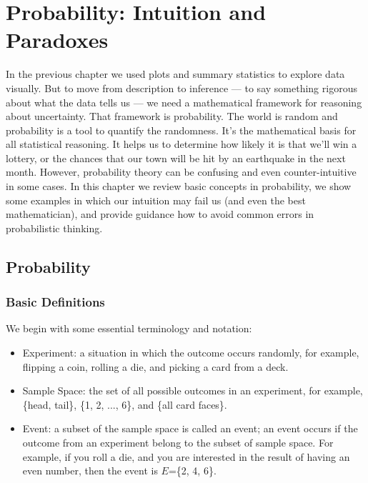 \chapter{Probability: Intuition and Paradoxes}\label{ch:probability}

\hypertarget{Randomworld}{In the previous chapter we used plots and summary
statistics to explore data visually. But to move from description to
inference --- to say something rigorous about what the data tells us --- we
need a mathematical framework for reasoning about uncertainty. That framework
is probability. The world is random and probability is a tool to
quantify the randomness. It's the mathematical basis for all statistical
reasoning. It helps us to determine how likely it is that we'll win a lottery,
or the chances that our town will be hit by an earthquake in the next month.
However, probability theory can be confusing and even counter-intuitive in some
cases. In this chapter we review basic concepts in probability, we show some
examples in which our intuition may fail us (and even the best mathematician),
and provide guidance how to avoid common errors in probabilistic thinking.}

\section{Probability}\label{sec:probability}
\subsection{Basic Definitions}
We begin with some essential terminology and notation: 
\begin{itemize}
\item Experiment: a situation in which the outcome occurs randomly, for example,
  flipping a coin, rolling a die, and picking a card from a deck.
\item Sample Space: the set of all possible outcomes in an experiment, for example,
\{head, tail\}, \{1, 2, ..., 6\}, and \{all card faces\}.
\item Event: a subset of the sample space is called an event; an event occurs
if the outcome from an experiment belong to the subset of sample space. For
example, if
  you roll a die, and you are interested in the result of having an even
number, then the event is $E$=\{2, 4, 6\}.
\end{itemize}

